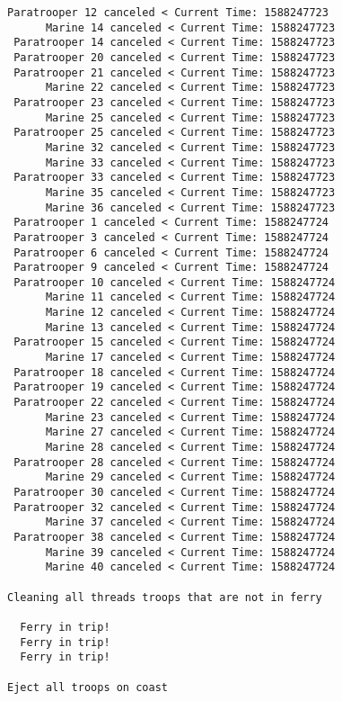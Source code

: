 \documentclass{article}
\begin{document}
\begin{lstlisting}[]
 Paratrooper 12 canceled < Current Time: 1588247723 
      Marine 14 canceled < Current Time: 1588247723 
 Paratrooper 14 canceled < Current Time: 1588247723 
 Paratrooper 20 canceled < Current Time: 1588247723 
 Paratrooper 21 canceled < Current Time: 1588247723 
      Marine 22 canceled < Current Time: 1588247723 
 Paratrooper 23 canceled < Current Time: 1588247723 
      Marine 25 canceled < Current Time: 1588247723 
 Paratrooper 25 canceled < Current Time: 1588247723 
      Marine 32 canceled < Current Time: 1588247723 
      Marine 33 canceled < Current Time: 1588247723 
 Paratrooper 33 canceled < Current Time: 1588247723 
      Marine 35 canceled < Current Time: 1588247723 
      Marine 36 canceled < Current Time: 1588247723 
 Paratrooper 1 canceled < Current Time: 1588247724 
 Paratrooper 3 canceled < Current Time: 1588247724 
 Paratrooper 6 canceled < Current Time: 1588247724 
 Paratrooper 9 canceled < Current Time: 1588247724 
 Paratrooper 10 canceled < Current Time: 1588247724 
      Marine 11 canceled < Current Time: 1588247724 
      Marine 12 canceled < Current Time: 1588247724 
      Marine 13 canceled < Current Time: 1588247724 
 Paratrooper 15 canceled < Current Time: 1588247724 
      Marine 17 canceled < Current Time: 1588247724 
 Paratrooper 18 canceled < Current Time: 1588247724 
 Paratrooper 19 canceled < Current Time: 1588247724 
 Paratrooper 22 canceled < Current Time: 1588247724 
      Marine 23 canceled < Current Time: 1588247724 
      Marine 27 canceled < Current Time: 1588247724 
      Marine 28 canceled < Current Time: 1588247724 
 Paratrooper 28 canceled < Current Time: 1588247724 
      Marine 29 canceled < Current Time: 1588247724 
 Paratrooper 30 canceled < Current Time: 1588247724 
 Paratrooper 32 canceled < Current Time: 1588247724 
      Marine 37 canceled < Current Time: 1588247724 
 Paratrooper 38 canceled < Current Time: 1588247724 
      Marine 39 canceled < Current Time: 1588247724 
      Marine 40 canceled < Current Time: 1588247724 

Cleaning all threads troops that are not in ferry

  Ferry in trip!
  Ferry in trip!
  Ferry in trip!

Eject all troops on coast


\end{lstlisting}
\end{document}
